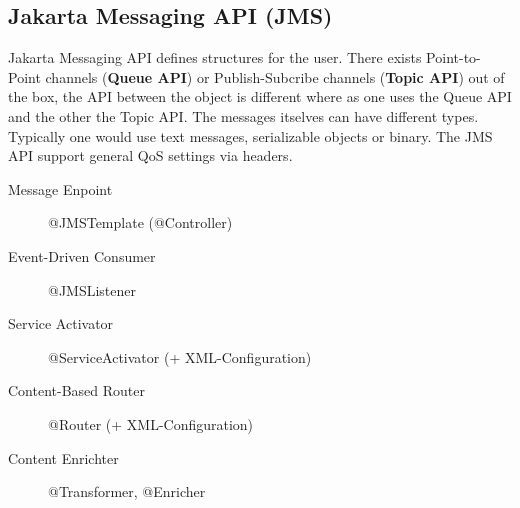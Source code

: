 \documentclass[../Main.tex]{subfiles}
\begin{document}
\subsection{Jakarta Messaging API (JMS)}
Jakarta Messaging API defines structures for the user. There exists Point-to-Point channels (\textbf{Queue API}) or 
Publish-Subcribe channels (\textbf{Topic API}) out of the box, the API between the object is different where as one uses the 
Queue API and the other the Topic API. The messages itselves can have different types. Typically one would 
use text messages, serializable objects or binary. The JMS API support general QoS settings via headers.

\begin{description}
    \item[Message Enpoint] @JMSTemplate (@Controller)
    \item[Event-Driven Consumer] @JMSListener
    \item[Service Activator] @ServiceActivator (+ XML-Configuration)
    \item[Content-Based Router] @Router (+ XML-Configuration)
    \item[Content Enrichter] @Transformer, @Enricher
\end{description}

\newpage
\end{document}
